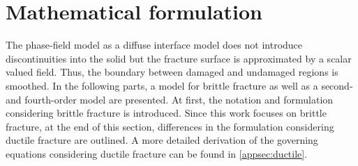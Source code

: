 \section{Mathematical formulation} \label{sec:formul}
The phase-field model as a diffuse interface model does not introduce discontinuities into the solid but the fracture surface is approximated by a scalar valued field. Thus, the boundary between damaged and undamaged regions is smoothed. In the following parts, a model for brittle fracture as well as a second- and fourth-order model are presented. At first, the notation and formulation considering brittle fracture is introduced. Since this work focuses on brittle fracture, at the end of this section, differences in the formulation considering ductile fracture are outlined. A more detailed derivation of the governing equations considering ductile fracture can be found in \ref{appsec:ductile}. 

